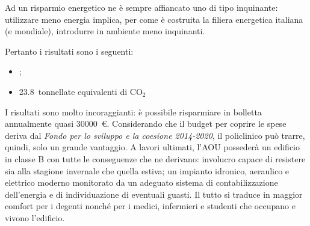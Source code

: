 Ad un risparmio energetico ne è sempre affiancato uno di tipo inquinante: utilizzare meno energia implica, per come è costruita la filiera energetica italiana (e mondiale), introdurre in ambiente meno inquinanti.

Pertanto i risultati sono i seguenti:
\begin{itemize}
	\item {}; %
	\item \num{23.8}\ tonnellate equivalenti di $\mathrm{CO_2}$ %
\end{itemize}

I risultati sono molto incoraggianti: è possibile risparmiare in bolletta annualmente quasi \num{30000}\ \euro. Considerando che il budget per coprire le spese deriva dal \emph{Fondo per lo sviluppo e la coesione 2014-2020}, il policlinico può trarre, quindi, solo un grande vantaggio. A lavori ultimati, l'AOU possederà un edificio in classe B con tutte le conseguenze che ne derivano: involucro capace di resistere sia alla stagione invernale che quella estiva; un impianto idronico, aeraulico e elettrico moderno monitorato da un adeguato sistema di contabilizzazione dell'energia e di individuazione di eventuali guasti. Il tutto si traduce in maggior comfort per i degenti nonché per i medici, infermieri e studenti che occupano e vivono l'edificio.